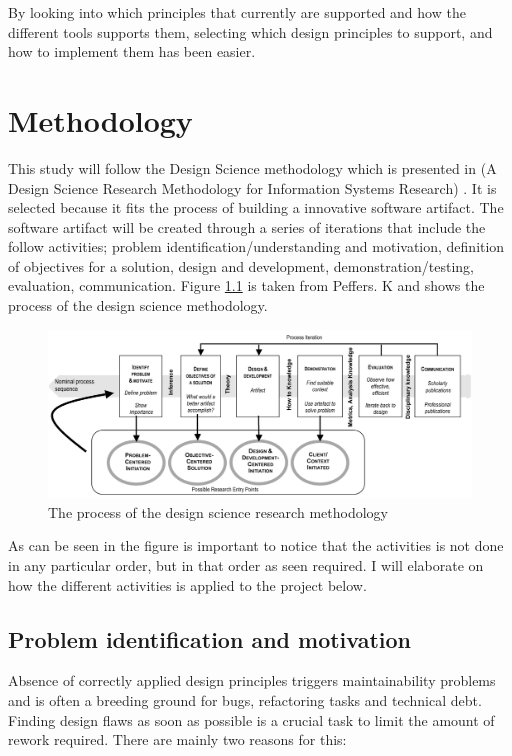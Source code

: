 \documentclass{report}
\begin{document}
By looking into which principles that currently are supported and how the different tools supports them,  selecting which design principles to support, and how to implement them has been easier.





\chapter{Methodology}
\label{methodology}
This study will follow the Design Science methodology which is presented in (A Design Science Research Methodology for Information Systems Research) \cite{10.2753/MIS0742-1222240302}. It is selected because it fits the process of building a innovative software artifact. The software artifact will be created through a series of iterations that include the follow activities; problem identification/understanding and motivation, definition of objectives for a solution, design and development, demonstration/testing, evaluation, communication. Figure \ref{fig:designScience} is taken from Peffers. K \cite{Peffers2007ADS} and shows the process of the design science methodology. 

\begin{figure}[h!]
    \centering
    \includegraphics[width=\textwidth]{report/images/designScience.png}
    \caption{The process of the design science research methodology}
    \label{fig:designScience}
\end{figure}



As can be seen in the figure is important to notice that the activities is not done in any particular order, but in that order as seen required. I will elaborate on how the different activities is applied to the project below. 



\section{Problem identification and motivation}
Absence of correctly applied design principles triggers maintainability problems and is often a breeding ground for bugs, refactoring tasks and technical debt. Finding design flaws as soon as possible is a crucial task to limit the amount of rework required. There are mainly two reasons for this: 
\end{document}
